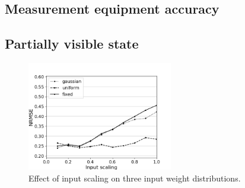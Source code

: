 \subsection{Measurement equipment accuracy}

\subsection{Partially visible state}

\begin{figure}[htbp]
  \centering
  \includegraphics[width=2.5in]{img/input_scaling_distrib.png}
  \caption{
    Effect of input scaling on three input weight distributions.
  }
  \label{performance}
\end{figure}

